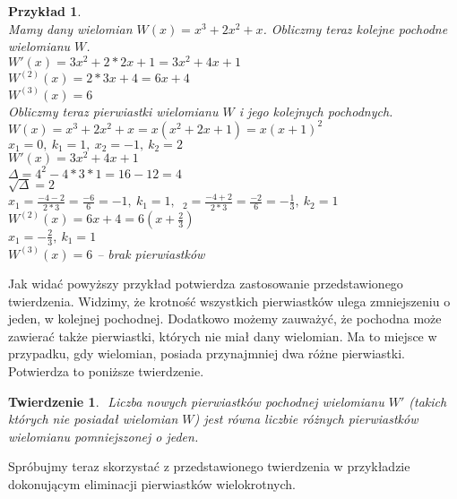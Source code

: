 \documentclass[oneside,a4paper]{book}
\newtheorem{theorem}{Twierdzenie}
\newtheorem{example}{Przykład}
\begin{document}
	\begin{example}
		$ $\\
		Mamy dany wielomian $W(x) = x^3 + 2x^2 + x$. Obliczmy teraz kolejne pochodne wielomianu $W$. \\
		$W'(x) = 3x^2 + 2*2x + 1 = 3x^2 + 4x + 1 $ \\
		$W^{(2)}(x) = 2*3x + 4 = 6x + 4 $ \\
		$W^{(3)}(x) = 6$ \\
		Obliczmy teraz pierwiastki wielomianu $W$ i jego kolejnych pochodnych. \\
		$W(x) = x^3 + 2x^2 + x = x(x^2 + 2x +1) = x(x + 1)^2$ \\
		$x_1 = 0,\ k_1 = 1,\ x_2 = -1,\ k_2 = 2$ \\
		$W'(x) = 3x^2 + 4x + 1$ \\
		$\Delta = 4^2 - 4*3*1 = 16 - 12 = 4$ \\
		$\sqrt{\Delta} = 2$ \\
		$x_1 = \frac{-4-2}{2*3} = \frac{-6}{6} = -1,\ k_1 = 1,$\ $_2 = \frac{-4+2}{2*3} = \frac{-2}{6} = -\frac{1}{3},\ k_2 = 1$ \\
		$W^{(2)}(x) = 6x + 4 = 6 (x + \frac{2}{3})$ \\
		$x_1 = -\frac{2}{3},\ k_1 = 1$ \\
		$W^{(3)}(x) = 6$ -- brak pierwiastków
	\end{example}
	
	Jak widać powyższy przykład potwierdza zastosowanie przedstawionego twierdzenia. Widzimy, że krotność wszystkich pierwiastków ulega zmniejszeniu o jeden, w kolejnej pochodnej. Dodatkowo możemy zauważyć, że pochodna może zawierać także pierwiastki, których nie miał dany wielomian. Ma to miejsce w przypadku, gdy wielomian, posiada przynajmniej dwa różne pierwiastki. Potwierdza to poniższe twierdzenie.
	
	\begin{theorem}
		$ $
		Liczba nowych pierwiastków pochodnej wielomianu $W'$ (takich których nie posiadał wielomian $W$) jest równa liczbie różnych pierwiastków wielomianu pomniejszonej o jeden.
	\end{theorem}
	
	Spróbujmy teraz skorzystać z przedstawionego twierdzenia w przykładzie dokonującym eliminacji pierwiastków wielokrotnych.
	
\end{document}
